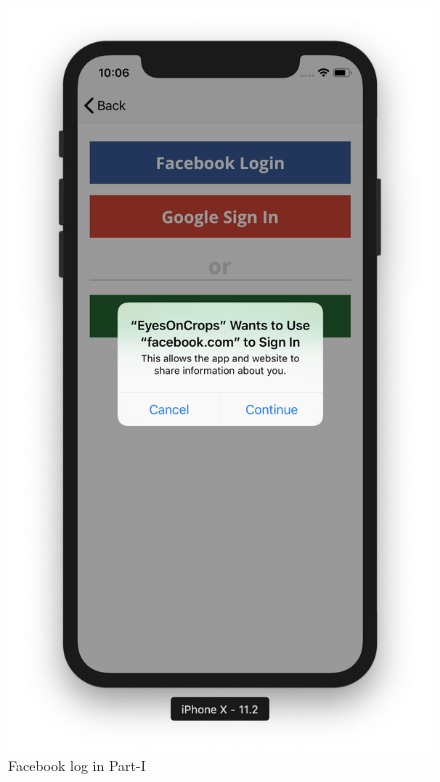 \begin{itemize}
\begin{itemize}
      \begin{figure}[!htb]
        \begin{minipage}{0.5\textwidth}
            \centering
            \includegraphics[width=0.8\linewidth]{figures/ch4/facebook_1.png}
            \caption{Facebook log in Part-I}\label{Fig:facebook_part_1}
        \end{minipage}\hfill
        \begin{minipage}{0.5\textwidth}
            \centering

\end{minipage}
\end{figure}
\end{itemize}
\end{itemize}
